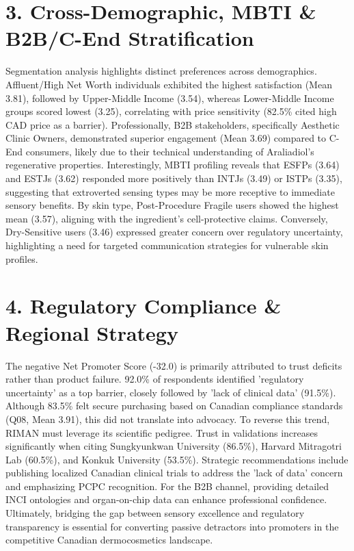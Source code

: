 \documentclass[10pt,twocolumn,a4paper]{article}
\begin{document}
\section{3. Cross-Demographic, MBTI \& B2B/C-End Stratification}
Segmentation analysis highlights distinct preferences across demographics. Affluent/High Net Worth individuals exhibited the highest satisfaction (Mean 3.81), followed by Upper-Middle Income (3.54), whereas Lower-Middle Income groups scored lowest (3.25), correlating with price sensitivity (82.5\% cited high CAD price as a barrier). Professionally, B2B stakeholders, specifically Aesthetic Clinic Owners, demonstrated superior engagement (Mean 3.69) compared to C-End consumers, likely due to their technical understanding of Araliadiol’s regenerative properties. Interestingly, MBTI profiling reveals that ESFPs (3.64) and ESTJs (3.62) responded more positively than INTJs (3.49) or ISTPs (3.35), suggesting that extroverted sensing types may be more receptive to immediate sensory benefits. By skin type, Post-Procedure Fragile users showed the highest mean (3.57), aligning with the ingredient’s cell-protective claims. Conversely, Dry-Sensitive users (3.46) expressed greater concern over regulatory uncertainty, highlighting a need for targeted communication strategies for vulnerable skin profiles.
\section{4. Regulatory Compliance \& Regional Strategy}
The negative Net Promoter Score (-32.0) is primarily attributed to trust deficits rather than product failure. 92.0\% of respondents identified 'regulatory uncertainty' as a top barrier, closely followed by 'lack of clinical data' (91.5\%). Although 83.5\% felt secure purchasing based on Canadian compliance standards (Q08, Mean 3.91), this did not translate into advocacy. To reverse this trend, RIMAN must leverage its scientific pedigree. Trust in validations increases significantly when citing Sungkyunkwan University (86.5\%), Harvard Mitragotri Lab (60.5\%), and Konkuk University (53.5\%). Strategic recommendations include publishing localized Canadian clinical trials to address the 'lack of data' concern and emphasizing PCPC recognition. For the B2B channel, providing detailed INCI ontologies and organ-on-chip data can enhance professional confidence. Ultimately, bridging the gap between sensory excellence and regulatory transparency is essential for converting passive detractors into promoters in the competitive Canadian dermocosmetics landscape.
\end{document}
